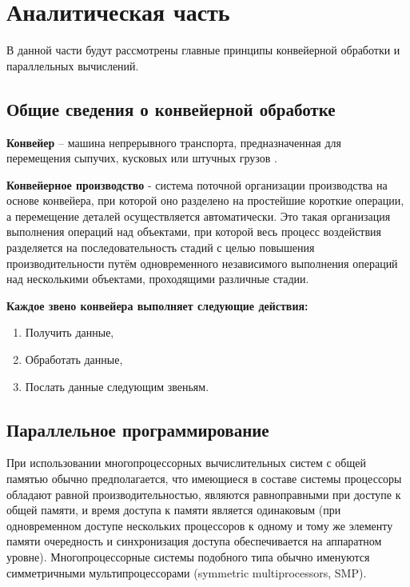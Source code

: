 \documentclass[12pt]{report}
\begin{document}
\chapter{Аналитическая часть}
В данной части будут рассмотрены главные принципы конвейерной обработки и параллельных вычислений.

\section{Общие сведения о конвейерной обработке}
\par
\textbf{Конвейер} – машина непрерывного транспорта, предназначенная для перемещения сыпучих, кусковых или штучных грузов \cite{mednov}.


\textbf{Конвейерное производство} - система поточной организации производства на основе конвейера, при которой оно разделено на простейшие короткие операции, а перемещение деталей осуществляется автоматически. Это такая организация выполнения операций над объектами, при которой весь процесс воздействия разделяется на последовательность стадий с целью повышения производительности путём одновременного независимого выполнения операций над несколькими объектами, проходящими различные стадии.

\begin{flushleft}
\textbf{Каждое звено конвейера выполняет следующие действия:}
\begin{enumerate}
	\item Получить данные,
	\item Обработать данные,
	\item Послать данные следующим звеньям.

\end{enumerate}
\end{flushleft}
\section{Параллельное программирование}

При использовании многопроцессорных вычислительных систем с общей памятью обычно предполагается, что имеющиеся в составе системы процессоры обладают равной производительностью, являются равноправными при доступе к общей памяти, и время доступа к памяти является одинаковым (при одновременном доступе нескольких процессоров к одному и тому же элементу памяти очередность и синхронизация доступа обеспечивается на аппаратном уровне). Многопроцессорные системы подобного типа обычно именуются симметричными мультипроцессорами (symmetric multiprocessors, SMP).
\end{document}
